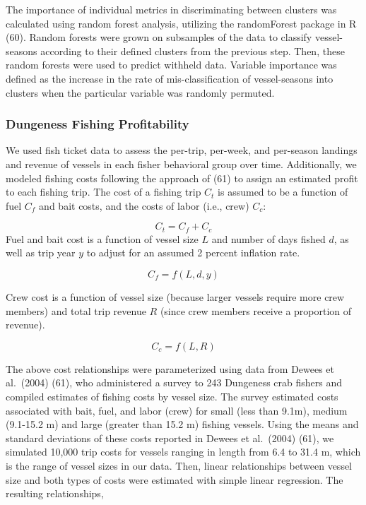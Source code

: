 \documentclass[9pt,twocolumn,twoside,lineno]{pnas-new}
\begin{document}
The importance of individual metrics in discriminating between clusters
was calculated using random forest analysis, utilizing the randomForest
package in R (60). Random forests were grown on subsamples of the data
to classify vessel-seasons according to their defined clusters from the
previous step. Then, these random forests were used to predict withheld
data. Variable importance was defined as the increase in the rate of
mis-classification of vessel-seasons into clusters when the particular
variable was randomly permuted.

\hypertarget{dungeness-fishing-profitability}{%
\subsubsection*{Dungeness Fishing
Profitability}\label{dungeness-fishing-profitability}}

We used fish ticket data to assess the per-trip, per-week, and
per-season landings and revenue of vessels in each fisher behavioral
group over time. Additionally, we modeled fishing costs following the
approach of (61) to assign an estimated profit to each fishing trip. The
cost of a fishing trip \(C_t\) is assumed to be a function of fuel
\(C_f\) and bait costs, and the costs of labor (i.e., crew) \(C_c\):

\[C_t = C_f + C_c\] Fuel and bait cost is a function of vessel size
\(L\) and number of days fished \(d\), as well as trip year \(y\) to
adjust for an assumed 2 percent inflation rate.

\[C_f = f(L,d,y)\]

Crew cost is a function of vessel size (because larger vessels require
more crew members) and total trip revenue \(R\) (since crew members
receive a proportion of revenue).

\[C_c = f(L,R)\]

The above cost relationships were parameterized using data from Dewees
et al.~(2004) (61), who administered a survey to 243 Dungeness crab
fishers and compiled estimates of fishing costs by vessel size. The
survey estimated costs associated with bait, fuel, and labor (crew) for
small (less than 9.1m), medium (9.1-15.2 m) and large (greater than 15.2
m) fishing vessels. Using the means and standard deviations of these
costs reported in Dewees et al.~(2004) (61), we simulated 10,000 trip
costs for vessels ranging in length from 6.4 to 31.4 m, which is the
range of vessel sizes in our data. Then, linear relationships between
vessel size and both types of costs were estimated with simple linear
regression. The resulting relationships,
\end{document}
